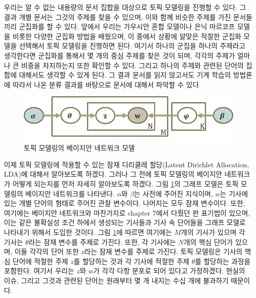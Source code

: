 \documentclass[a4paper]{oblivoir}
\begin{document}
우리는 알 수 없는 내용량의 문서 집합을 대상으로 토픽 모델링을 진행할 수 있다. 그 결과 개별 문서는 그것의 주제를 찾을 수 있으며, 이와 함께 비슷한 주제를 가진 문서들끼리 군집화를 할 수 있다. 앞에서 우리는 가우시안 혼합 모델이나 은닉 마르코프 모델을 비롯한 다양한 군집화 방법을 배웠으며, 이 중에서 상황에 알맞은 적절한 군집화 모델을 선택해서 토픽 모델링을 진행하면 된다. 여기서 하나의 군집을 하나의 주제라고 생각한다면 군집화를 통해서 몇 개의 중심 주제를 찾은 것이 되며, 각각의 주제가 얼마나 큰 비중을 차지하는지 또한 확인할 수 있다. 그리고 하나의 주제와 관련된 단어의 집합에 대해서도 생각할 수 있게 된다. 그 결과 문서를 읽지 않고서도 기계 학습의 방법론에 따라서 나온 분류 결과를 바탕으로 문서에 대해서 파악할 수 있다. \\

\begin{figure}[ht] \centering 
\includegraphics[scale=0.9]{fig10_21.png} 
\caption{토픽 모델링의 베이지안 네트워크 모델}
\label{fig:10-20}
\end{figure}

이제 토픽 모델링에 적용할 수 있는 잠재 디리클레 할당(Latent Dirichlet Allocation, LDA)에 대해서 알아보도록 하겠다. 그러나 그 전에 토픽 모델링의 베이지안 네트워크가 어떻게 되는지를 먼저 자세히 알아보도록 하겠다. 그림 \ref{fig:10-20}의 그래프 모델은 토픽 모델링의 베이지안 네트워크를 나타낸다. $\alpha$와 $\beta$는 사전에 주어진 지식이며, $w$는 기사에 있는 개별 단어의 형태로 주어진 관찰 변수이다. 나머지는 모두 잠재 변수이다. 또한, 여기에는 베이지안 네트워크와 마찬가지로 chapter 7에서 다뤘던 판 표기법이 있으며, 이는 같은 불확실성 조건 하에서 생성되는 기사들과 기사 속 단어들을 그래프 모델로 나타내기 위해서 도입한 것이다. 그림 \ref{fig:10-20}에 따르면 여기에는 $M$개의 기사가 있으며 각 기사는 $\theta$라는 잠재 변수를 주제로 가진다. 또한, 각 기사에는 $N$개의 핵심 단어가 있으며, 이들 각각의 단어 또한 $z$라는 잠재 변수를 주제로 가진다. 토픽 모델링은 기사의 핵심 단어에 적절한 주제 $z$를 할당하는 것과 각 기사에 적절한 주제 $\theta$를 할당하는 과정을 포함한다. 여기서 우리는 $z$와 $w$가 각각 다항 분포로 되어 있다고 가정하겠다. 현실의 이슈, 그리고 그것과 관련된 단어는 원래부터 몇 개 내지는 수십 개에 불과하기 때문이다. \\
\end{document}
